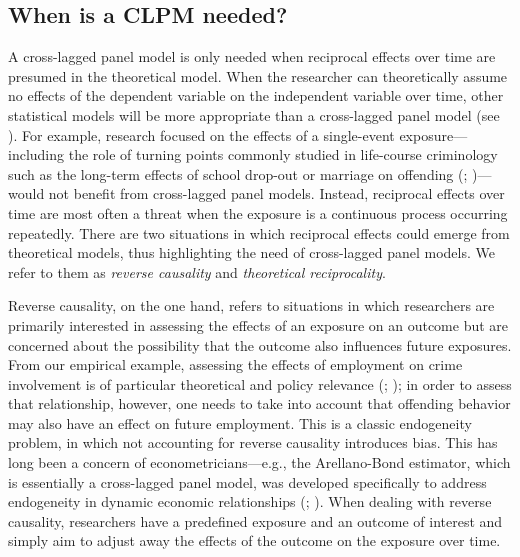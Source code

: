 \documentclass[
  letterpaper,
  DIV=11,
  numbers=noendperiod]{scrartcl}
\begin{document}
\subsection{When is a CLPM needed?}\label{when-is-a-clpm-needed}

A cross-lagged panel model is only needed when reciprocal effects over
time are presumed in the theoretical model. When the researcher can
theoretically assume no effects of the dependent variable on the
independent variable over time, other statistical models will be more
appropriate than a cross-lagged panel model (see
). For example, research
focused on the effects of a single-event exposure---including the role
of turning points commonly studied in life-course criminology such as
the long-term effects of school drop-out or marriage on offending
(;
)---would
not benefit from cross-lagged panel models. Instead, reciprocal effects
over time are most often a threat when the exposure is a continuous
process occurring repeatedly. There are two situations in which
reciprocal effects could emerge from theoretical models, thus
highlighting the need of cross-lagged panel models. We refer to them as
\emph{reverse causality} and \emph{theoretical reciprocality}.

Reverse causality, on the one hand, refers to situations in which
researchers are primarily interested in assessing the effects of an
exposure on an outcome but are concerned about the possibility that the
outcome also influences future exposures. From our empirical example,
assessing the effects of employment on crime involvement is of
particular theoretical and policy relevance
(;
); in order to assess
that relationship, however, one needs to take into account that
offending behavior may also have an effect on future employment. This is
a classic endogeneity problem, in which not accounting for reverse
causality introduces bias. This has long been a concern of
econometricians---e.g., the Arellano-Bond estimator, which is
essentially a cross-lagged panel model, was developed specifically to
address endogeneity in dynamic economic relationships
(;
). When dealing with reverse causality, researchers have a
predefined exposure and an outcome of interest and simply aim to adjust
away the effects of the outcome on the exposure over time.
\end{document}
